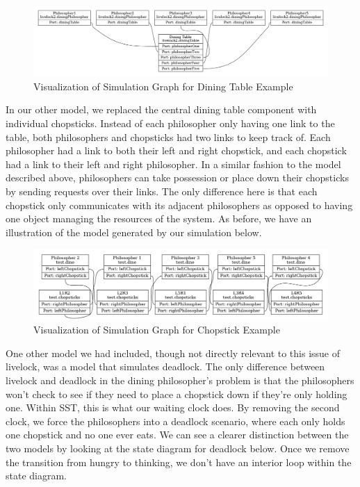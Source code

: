 \documentclass{article}
\begin{document}
\begin{figure}[H]
    \centering
    \includegraphics[scale=0.3]{images/livelock2.png}
    \caption{Visualization of Simulation Graph for Dining Table Example}
\end{figure}

In our other model, we replaced the central dining table component with individual chopsticks. Instead of each philosopher only having 
one link to the table, both philosophers and chopsticks had two links to keep track of.  Each philosopher had a link to both their left and 
right chopstick, and each chopstick had a link to their left and right philosopher.  In a similar fashion to the model described above, 
philosophers can take possession or place down their chopsticks by sending requests over their links.  The only difference here is that 
each chopstick only communicates with its adjacent philosophers as opposed to having one object managing the resources of the system. As before, we have an illustration of the model generated by our simulation below.

\begin{figure}[H]
    \centering
    \includegraphics[scale=0.3]{images/test.png}
    \caption{Visualization of Simulation Graph for Chopstick Example}
\end{figure}

One other model we had included, though not directly relevant to this issue of livelock, was a model that simulates deadlock.  The 
only difference between livelock and deadlock in the dining philosopher’s problem is that the philosophers won’t check to see if they 
need to place a chopstick down if they’re only holding one.  Within SST, this is what our waiting clock does.  By removing the second clock, 
we force the philosophers into a deadlock scenario, where each only holds one chopstick and no one ever eats.  We can see a clearer distinction between the two models by looking at the state diagram for deadlock below.  Once we remove the transition from hungry to thinking, we don't have an interior loop within the state diagram.
\end{document}
